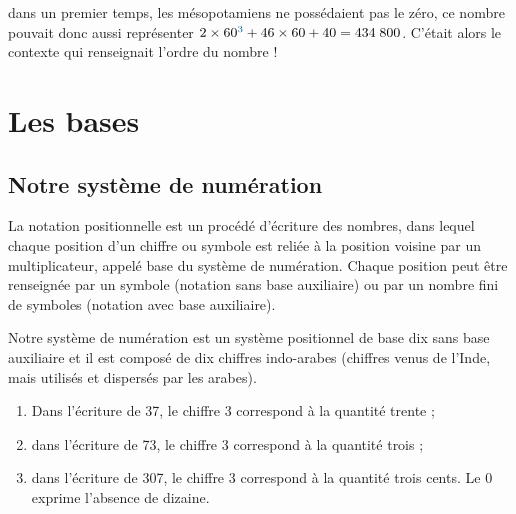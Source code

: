 \begin{remarque}
   dans un premier temps, les mésopotamiens ne possédaient pas le zéro, ce nombre pouvait donc aussi représenter $2\times60^{\textcolor{A1}{3}}+46\times 60+40=434\;800$. C'était alors le contexte qui renseignait l'ordre du nombre !
\end{remarque}



\section{Les bases}

\subsection{Notre système de numération} %

   La notation positionnelle est un procédé d'écriture des nombres, dans lequel chaque position d'un chiffre ou symbole est reliée à la position voisine par un multiplicateur, appelé base du système de numération. Chaque position peut être renseignée par un symbole (notation sans base auxiliaire) ou par un nombre fini de symboles (notation avec base auxiliaire). 
   
Notre système de numération est un système positionnel de base dix sans  base auxiliaire et il est composé de dix chiffres indo-arabes (chiffres venus de l'Inde, mais utilisés et dispersés par les arabes).
      
\begin{exemple*1}
   \begin{enumerate}
      \item Dans l'écriture de 37, le chiffre 3 correspond à la quantité trente ;
      \item dans l'écriture de 73, le chiffre 3 correspond à la quantité trois ;

      \item dans l'écriture de 307, le chiffre 3 correspond à la quantité trois cents. Le 0 exprime l'absence de dizaine.
   \end{enumerate}
\end{exemple*1}
   
